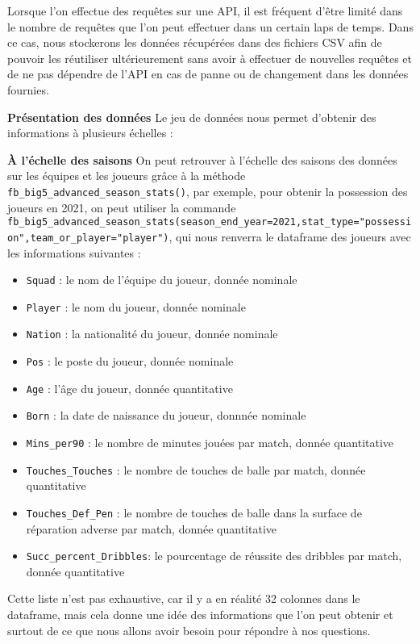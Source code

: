 \documentclass[
]{article}
\begin{document}
Lorsque l'on effectue des requêtes sur une API, il est fréquent d'être
limité dans le nombre de requêtes que l'on peut effectuer dans un
certain laps de temps. Dans ce cas, nous stockerons les données
récupérées dans des fichiers CSV afin de pouvoir les réutiliser
ultérieurement sans avoir à effectuer de nouvelles requêtes et de ne pas
dépendre de l'API en cas de panne ou de changement dans les données
fournies.

\textbf{Présentation des données} Le jeu de données nous permet
d'obtenir des informations à plusieurs échelles :

\textbf{À l'échelle des saisons} On peut retrouver à l'échelle des
saisons des données sur les équipes et les joueurs grâce à la méthode
\texttt{fb\_big5\_advanced\_season\_stats()}, par exemple, pour obtenir
la possession des joueurs en 2021, on peut utiliser la commande
\texttt{fb\_big5\_advanced\_season\_stats(season\_end\_year=2021,stat\_type="possession",team\_or\_player="player")},
qui nous renverra le dataframe des joueurs avec les informations
suivantes :

\begin{itemize}
\item
  \texttt{Squad} : le nom de l'équipe du joueur, donnée nominale
\item
  \texttt{Player} : le nom du joueur, donnée nominale
\item
  \texttt{Nation} : la nationalité du joueur, donnée nominale
\item
  \texttt{Pos} : le poste du joueur, donnée nominale
\item
  \texttt{Age} : l'âge du joueur, donnée quantitative
\item
  \texttt{Born} : la date de naissance du joueur, donnnée nominale
\item
  \texttt{Mins\_per90} : le nombre de minutes jouées par match, donnée
  quantitative
\item
  \texttt{Touches\_Touches} : le nombre de touches de balle par match,
  donnée quantitative
\item
  \texttt{Touches\_Def\_Pen} : le nombre de touches de balle dans la
  surface de réparation adverse par match, donnée quantitative
\item
  \texttt{Succ\_percent\_Dribbles}: le pourcentage de réussite des
  dribbles par match, donnée quantitative
\end{itemize}

Cette liste n'est pas exhaustive, car il y a en réalité 32 colonnes dans
le dataframe, mais cela donne une idée des informations que l'on peut
obtenir et surtout de ce que nous allons avoir besoin pour répondre à
nos questions.
\end{document}
